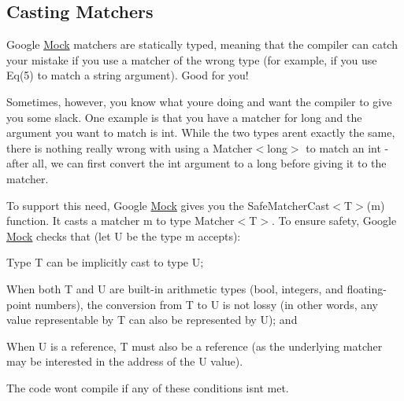 \subsection*{Casting Matchers}

Google \hyperlink{class_mock}{Mock} matchers are statically typed, meaning that the compiler can catch your mistake if you use a matcher of the wrong type (for example, if you use {\ttfamily Eq(5)} to match a {\ttfamily string} argument). Good for you!

Sometimes, however, you know what you\textquotesingle{}re doing and want the compiler to give you some slack. One example is that you have a matcher for {\ttfamily long} and the argument you want to match is {\ttfamily int}. While the two types aren\textquotesingle{}t exactly the same, there is nothing really wrong with using a {\ttfamily Matcher$<$long$>$} to match an {\ttfamily int} -\/ after all, we can first convert the {\ttfamily int} argument to a {\ttfamily long} before giving it to the matcher.

To support this need, Google \hyperlink{class_mock}{Mock} gives you the {\ttfamily Safe\+Matcher\+Cast$<$T$>$(m)} function. It casts a matcher {\ttfamily m} to type {\ttfamily Matcher$<$T$>$}. To ensure safety, Google \hyperlink{class_mock}{Mock} checks that (let {\ttfamily U} be the type {\ttfamily m} accepts)\+:


\begin{DoxyEnumerate}
\item Type {\ttfamily T} can be implicitly cast to type {\ttfamily U};
\end{DoxyEnumerate}
\begin{DoxyEnumerate}
\item When both {\ttfamily T} and {\ttfamily U} are built-\/in arithmetic types ({\ttfamily bool}, integers, and floating-\/point numbers), the conversion from {\ttfamily T} to {\ttfamily U} is not lossy (in other words, any value representable by {\ttfamily T} can also be represented by {\ttfamily U}); and
\end{DoxyEnumerate}
\begin{DoxyEnumerate}
\item When {\ttfamily U} is a reference, {\ttfamily T} must also be a reference (as the underlying matcher may be interested in the address of the {\ttfamily U} value).
\end{DoxyEnumerate}

The code won\textquotesingle{}t compile if any of these conditions isn\textquotesingle{}t met.


